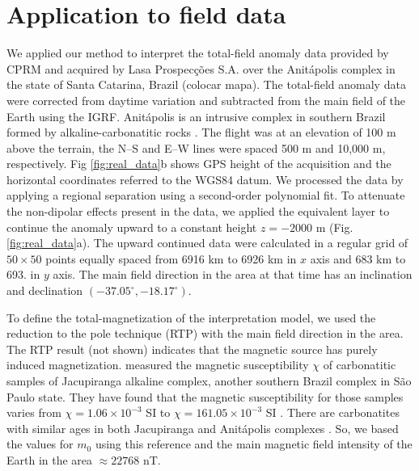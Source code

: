 \section{Application to field data}

We applied our method to interpret the total-field anomaly data provided by CPRM and acquired by Lasa Prospecções S.A. over the Anitápolis complex in the state of Santa Catarina, Brazil (colocar mapa). The total-field anomaly data were corrected from daytime variation and subtracted from the main field of the Earth using the IGRF. Anitápolis is an intrusive complex in southern Brazil formed by alkaline-carbonatitic rocks \cite[]{GOMES2018}. The flight was at an elevation of 100 m above the terrain, the N–S and E–W lines were spaced 500 m and 10,000 m, respectively. Fig \ref{fig:real_data}b shows GPS height of the acquisition and the horizontal coordinates referred to the WGS84 datum. We processed the data by applying a regional separation using a second-order polynomial fit. To attenuate the non-dipolar effects present in the data, we applied the equivalent layer \cite[]{dampney1969,emilia1973} to continue the anomaly upward to a constant height $z=-2000$ m (Fig. \ref{fig:real_data}a). The upward continued data were calculated in a regular grid of $50\times50$ points equally spaced from 6916 km to 6926 km in $x$ axis and 683 km to 693. in $y$ axis. The main field direction in the area at that time has an inclination and declination $(-37.05^\circ, -18.17^\circ)$.

To define the total-magnetization of the interpretation model, we used the reduction to the pole technique (RTP) with the main field direction in the area. The RTP result (not shown) indicates that the magnetic source has purely induced magnetization. \cite{valdivia-2009} measured the magnetic susceptibility $\chi$ of carbonatitic samples of Jacupiranga alkaline complex, another southern Brazil complex in São Paulo state. They have found that the magnetic susceptibility for those samples varies from $\chi = 1.06\times 10^{-3}$ SI to $\chi=161.05\times 10^{-3}$ SI \cite[][ tb. 1]{valdivia-2009}. There are carbonatites with similar ages in both Jacupiranga and Anitápolis complexes \cite[]{gibson-1999}. So, we based the values for $m_0$ using this reference and the main magnetic field intensity of the Earth in the area $ \approx 22768 $ nT.

